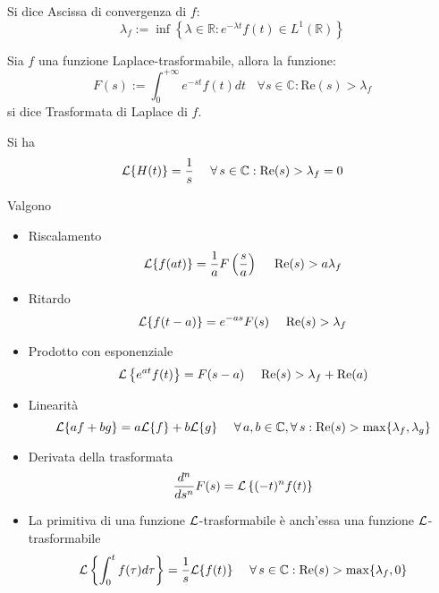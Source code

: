 \begin{defn}
Si dice Ascissa di convergenza di $\displaystyle f$:
\begin{equation*}
\lambda _{f} :=\inf\left\{\lambda \in \mathbb{R} :e^{-\lambda t} f( t) \in L^{1}(\mathbb{R})\right\}
\end{equation*}
\end{defn}
\begin{defn}
Sia $\displaystyle f$ una funzione Laplace-trasformabile, allora la funzione:
\begin{equation*}
\boxed{F( s) :=\int ^{+\infty }_{0} e^{-st} f( t) dt\ \ \ \ \forall s\in \mathbb{C} :\mathrm{Re}( s)  >\lambda _{f}}
\end{equation*}
si dice Trasformata di Laplace di $\displaystyle f$.
\end{defn}
\begin{rem}
 Si ha
\begin{equation*}
\Lc\{H( t)\} =\frac{1}{s} \ \ \ \ \forall s\in \mathbb{C} :\mathrm{Re}( s)  >\lambda _{f} =0
\end{equation*}
\end{rem}
\begin{thm}
[Proprietà] Valgono
\begin{itemize}
\item Riscalamento\begin{equation*}
\mathcal{L}\{f( at)\} =\frac{1}{a} F\left(\frac{s}{a}\right) \ \ \ \ \mathrm{Re}( s)  >a\lambda _{f}
\end{equation*}
\item Ritardo\begin{equation*}
\mathcal{L}\{f( t-a)\} =e^{-as} F( s) \ \ \ \ \mathrm{Re}( s)  >\lambda _{f}
\end{equation*}
\item Prodotto con esponenziale\begin{equation*}
\Lc\left\{e^{at} f( t)\right\} =F( s-a) \ \ \ \ \mathrm{Re}( s)  >\lambda _{f} +\mathrm{Re}( a)
\end{equation*}
\item Linearità\begin{equation*}
\Lc\{af+bg\} =a\Lc\{f\} +b\Lc\{g\} \ \ \ \ \forall a,b\in \mathbb{C} ,\forall s:\mathrm{Re}( s)  >\max\{\lambda _{f} ,\lambda _{g}\}
\end{equation*}
\item Derivata della trasformata\begin{equation*}
\frac{d^{n}}{ds^{n}} F( s) =\mathcal{L}\left\{( -t)^{n} f( t)\right\}
\end{equation*}
\item La primitiva di una funzione $\mathcal{L}$-trasformabile è anch'essa una funzione $\mathcal{L}$-trasformabile\begin{equation*}
\Lc\left\{\int ^{t}_{0} f( \tau ) d\tau \right\} =\frac{1}{s}\Lc\{f( t)\} \ \ \ \ \forall s\in \mathbb{C} :\mathrm{Re}( s)  >\max\{\lambda _{f} ,0\}
\end{equation*}
\end{itemize}
\end{thm}
